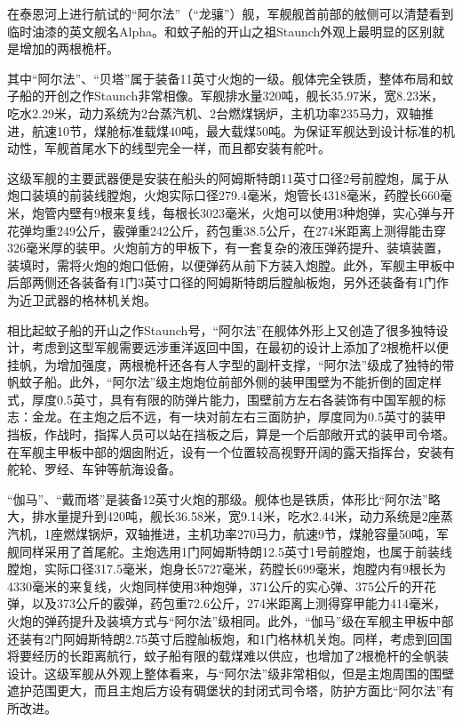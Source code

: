 \documentclass[12pt,UTF8]{ctexbook}
\begin{document}
在泰恩河上进行航试的“阿尔法”（“龙骧”）舰，军舰舰首前部的舷侧可以清楚看到临时油漆的英文舰名Alpha。和蚊子船的开山之祖Staunch外观上最明显的区别就是增加的两根桅杆。

其中“阿尔法”、“贝塔”属于装备11英寸火炮的一级。舰体完全铁质，整体布局和蚊子船的开创之作Staunch非常相像。军舰排水量320吨，舰长35.97米，宽8.23米，吃水2.29米，动力系统为2台蒸汽机、2台燃煤锅炉，主机功率235马力，双轴推进，航速10节，煤舱标准载煤40吨，最大载煤50吨。为保证军舰达到设计标准的机动性，军舰首尾水下的线型完全一样，而且都安装有舵叶。

这级军舰的主要武器便是安装在船头的阿姆斯特朗11英寸口径2号前膛炮，属于从炮口装填的前装线膛炮，火炮实际口径279.4毫米，炮管长4318毫米，药膛长660毫米，炮管内壁有9根来复线，每根长3023毫米，火炮可以使用3种炮弹，实心弹与开花弹均重249公斤，霰弹重242公斤，药包重38.5公斤，在274米距离上测得能击穿326毫米厚的装甲。火炮前方的甲板下，有一套复杂的液压弹药提升、装填装置，装填时，需将火炮的炮口低俯，以便弹药从前下方装入炮膛。此外，军舰主甲板中后部两侧还各装备有1门3英寸口径的阿姆斯特朗后膛舢板炮，另外还装备有1门作为近卫武器的格林机关炮。

相比起蚊子船的开山之作Staunch号，“阿尔法”在舰体外形上又创造了很多独特设计，考虑到这型军舰需要远涉重洋返回中国，在最初的设计上添加了2根桅杆以便挂帆，为增加强度，两根桅杆还各有人字型的副杆支撑，“阿尔法”级成了独特的带帆蚊子船。此外，“阿尔法”级主炮炮位前部外侧的装甲围壁为不能折倒的固定样式，厚度0.5英寸，具有有限的防弹片能力，围壁前方左右各装饰有中国军舰的标志：金龙。在主炮之后不远，有一块对前左右三面防护，厚度同为0.5英寸的装甲挡板，作战时，指挥人员可以站在挡板之后，算是一个后部敞开式的装甲司令塔。在军舰主甲板中部的烟囱附近，设有一个位置较高视野开阔的露天指挥台，安装有舵轮、罗经、车钟等航海设备。

“伽马”、“戴而塔”是装备12英寸火炮的那级。舰体也是铁质，体形比“阿尔法”略大，排水量提升到420吨，舰长36.58米，宽9.14米，吃水2.44米，动力系统是2座蒸汽机，1座燃煤锅炉，双轴推进，主机功率270马力，航速9节，煤舱容量50吨，军舰同样采用了首尾舵。主炮选用1门阿姆斯特朗12.5英寸1号前膛炮，也属于前装线膛炮，实际口径317.5毫米，炮身长5727毫米，药膛长699毫米，炮膛内有9根长为4330毫米的来复线，火炮同样使用3种炮弹，371公斤的实心弹、375公斤的开花弹，以及373公斤的霰弹，药包重72.6公斤，274米距离上测得穿甲能力414毫米，火炮的弹药提升及装填方式与“阿尔法”级相同。此外，“伽马”级在军舰主甲板中部还装有2门阿姆斯特朗2.75英寸后膛舢板炮，和1门格林机关炮。同样，考虑到回国将要经历的长距离航行，蚊子船有限的载煤难以供应，也增加了2根桅杆的全帆装设计。这级军舰从外观上整体看来，与“阿尔法”级非常相似，但是主炮周围的围壁遮护范围更大，而且主炮后方设有碉堡状的封闭式司令塔，防护方面比“阿尔法”有所改进。
\end{document}

